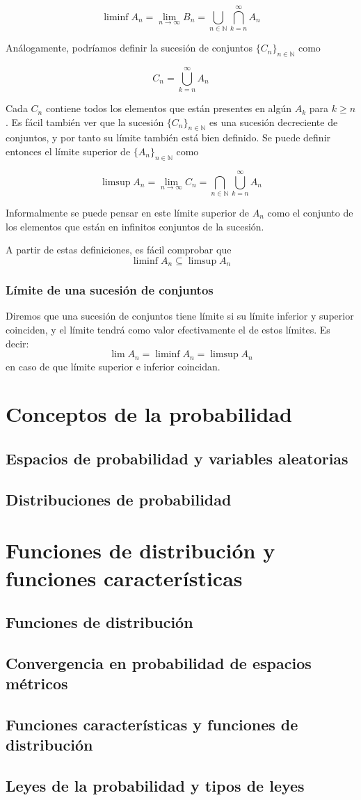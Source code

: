 \documentclass[12pt,a4paper,openright]{book}
\begin{document}
 $$ \liminf A_n = \lim_{n\to\infty} B_n = \bigcup_{n\in\mathbb{N}} \bigcap_{k=n}^{\infty} A_n $$

 Análogamente, podríamos definir la sucesión de conjuntos $\{C_n\}_{n\in\mathbb{N}}$ como

 $$ C_n = \bigcup_{k=n}^{\infty} A_n $$

Cada $C_n$ contiene todos los elementos que están presentes en algún $A_k$ para $k \geq n$. Es fácil también ver que la sucesión $\{C_n\}_{n\in\mathbb{N}}$ es una sucesión decreciente de conjuntos, y por tanto su límite también está bien definido. Se puede definir entonces el límite superior de $\{A_n\}_{n\in\mathbb{N}}$
como 

$$ \limsup A_n = \lim_{n\to\infty} C_n = \bigcap_{n\in\mathbb{N}} \bigcup_{k=n}^{\infty} A_n $$

Informalmente se puede pensar en este límite superior de $A_n$ como el conjunto de los elementos que están en infinitos conjuntos de la sucesión.

A partir de estas definiciones, es fácil comprobar que 
$$ \liminf A_n \subseteq \limsup A_n $$

\subsection{Límite de una sucesión de conjuntos}
Diremos que una sucesión de conjuntos tiene límite si su límite inferior y superior coinciden, y el límite tendrá como valor efectivamente el de estos límites. Es decir: 
$$ \lim A_n = \liminf A_n = \limsup A_n $$ 
en caso de que límite superior e inferior coincidan.
\chapter{Conceptos de la probabilidad}
\section{Espacios de probabilidad y variables aleatorias}
\section{Distribuciones de probabilidad}
\chapter{Funciones de distribución y funciones características}
\section{Funciones de distribución}
\section{Convergencia en probabilidad de espacios métricos}
\section{Funciones características y funciones de distribución}
\section{Leyes de la probabilidad y tipos de leyes}
\end{document}
